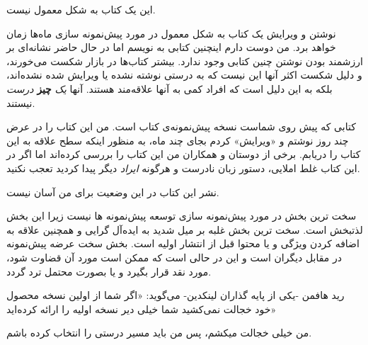 این یک کتاب به شکل معمول نیست.

نوشتن و ویرایش یک کتاب به شکل معمول در مورد پیش‌نمونه سازی ماه‌ها زمان
خواهد برد. من دوست دارم اینچنین کتابی به نویسم اما در حال حاضر نشانه‌ای
بر ارزشمند بودن نوشتن چنین کتابی وجود ندارد. بیشتر کتاب‌ها در بازار شکست
می‌خورند، و دلیل شکست اکثر آنها این نیست که به درستی نوشته نشده یا
ویرایش شده نشده‌اند، بلکه به این دلیل است که افراد کمی به آنها علاقه‌مند
هستند. آنها \emph{یک} \textbf{چیز} \emph{درست} نیستند.

کتابی که پیش روی شماست نسخه پیش‌نمونه‌ی کتاب است. من این کتاب را در عرض
چند روز نوشتم و «ویرایش» کردم بجای چند ماه، به منظور اینکه سطح علاقه به
این کتاب را دریابم. برخی از دوستان و همکاران من این کتاب را بررسی
کرده‌اند اما اگر در این کتاب غلط املایی، دستور زبان نادرست و هرگونه
\emph{ایراد} دیگر پیدا کردید تعجب نکنید.

نشر این کتاب در این وضعیت برای من آسان نیست.

سخت ترین بخش در مورد پیش‌نمونه سازی توسعه پیش‌نمونه ها نیست زیرا این بخش
لذتبخش است. سخت ترین بخش غلبه بر میل شدید به ایده‌آل گرایی و همچنین
علاقه به اضافه کردن ویژگی و یا محتوا قبل از انتشار اولیه است. بخش سخت
عرضه پیش‌نمونه در مقابل دیگران است و این در حالی است که ممکن است مورد آن
قضاوت شود، مورد نقد قرار بگیرد و یا بصورت محتمل ترد گردد.

رید هافمن -یکی از پایه گذاران لینکدین- می‌گوید: «اگر شما از اولین نسخه
محصول خود خجالت نمی‌کشید شما خیلی دیر نسخه اولیه را ارائه کرده‌اید»

من خیلی خجالت میکشم، پس من باید مسیر درستی را انتخاب کرده باشم.
